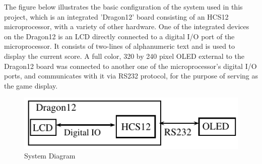 The figure below illustrates the basic configuration of the system used in this project, which is an integrated 'Dragon12' board consisting of an HCS12 microprocessor, with a variety of other hardware.
One of the integrated devices on the Dragon12 is an LCD directly connected to a digital I/O port of the microprocessor.
It consists of two-lines of alphanumeric text and is used to display the current score.
A full color, 320 by 240 pixel OLED external to the Dragon12 board was connected to another one of the microprocessor's digital I/O ports, and communicates with it via RS232 protocol, for the purpose of serving as the game display.

\begin{figure}[htp]
    \centering
    \includegraphics[width=.6\textwidth]{images/SystemDiagram.pdf}
    \caption{System Diagram}
    \label{fig:sysdiag}
\end{figure}